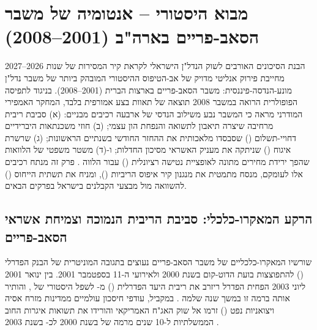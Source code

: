 
\chapter{מבוא היסטורי  – אנטומיה של משבר הסאב-פריים בארה"ב (\num{2001}--\num{2008})}
\label{ch:us_subprime}

הבנת הסיכונים האורבים לשוק הנדל"ן הישראלי לקראת קיר המסירות של שנות \num{2026}--\num{2027} מחייבת פירוק אנליטי מדויק של אב-הטיפוס ההיסטורי המובהק ביותר של משבר נדל"ן מונע-הנדסה-פיננסית: משבר הסאב-פריים בארצות הברית (\num{2001}--\num{2008}). בניגוד לתפיסה הפופולרית הרואה במשבר \num{2008} תוצאה של תאוות בצע אמורפית בלבד, המחקר האמפירי המודרני מראה כי המשבר נבע משילוב הנדסי של ארבעה רכיבים מבניים: (א) סביבת ריבית מרחיבה שיצרה תיאבון לתשואה והנפחת הון עצמי; (ב) חוזי משכנתאות היברידיים דחויי-תשלום () שסבסדו מלאכותית את ההחזר החודשי בשנתיים הראשונות; (ג) שרשרת איגוח () שניתקה את מעניק האשראי מסיכון החדלות; ו-(ד) משטר משפטי של הלוואות  שהפך ירידת מחירים מתונה לאופציית נטישה רציונלית () עבור הלווה \cite{mian2009consequences,mayer2009rise,keys2010did,gorton2009securitized}. פרק זה מנתח רכיבים אלו לעומקם, מנסח מתמטית את מנגנון קיר איפוס הריביות (), ומניח את תשתית הייחוס () להשוואה מול מבצעי הקבלנים בישראל בפרקים הבאים.

\section{הרקע המאקרו-כלכלי: סביבת הריבית הנמוכה וצמיחת אשראי הסאב-פריים}
\label{sec:subprime_macro}

שורשיו המאקרו-כלכליים של משבר הסאב-פריים נעוצים בתגובה המוניטרית של הבנק הפדרלי () להתפוצצות בועת הדוט-קום בשנת \num{2000} ולאירועי ה-\num{11} בספטמבר \num{2001}. בין ינואר \num{2001} ליוני \num{2003} הפחית הפדרל ריזרב את ריבית היעד הפדרלית () מ- לשפל היסטורי של , והותיר אותה ברמה זו במשך שנה שלמה \cite{bernanke2010monetary}. במקביל, עודפי חיסכון עולמיים ממדינות מזרח אסיה ויצואניות נפט () זרמו אל שוק האג"ח האמריקאי והורידו את תשואות איגרות החוב הממשלתיות ל-\num{10} שנים מרמה של  בשנת \num{2000} לכ- בשנת \num{2003} \cite{bernanke2010monetary,reinhart2009this}.

